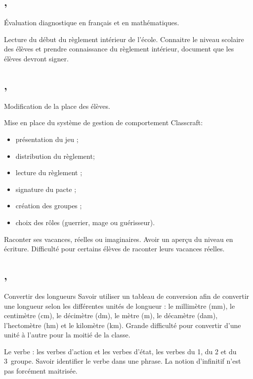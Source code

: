 \documentclass{article}
\begin{document}
	
	\subsection{ \sep}
	\textbullet{} Évaluation diagnostique en français et en mathématiques.
	
	 Lecture du début du règlement intérieur de l’école.
	\obj Connaitre le niveau scolaire des élèves et prendre connaissance du règlement intérieur, document que les élèves devront signer.
	
	
	\subsection{ \sep}
	\textbullet{} Modification de la place des élèves.
	
	\textbullet{} Mise en place du système de gestion de comportement Classcraft:
	\begin{itemize}
		\item présentation du jeu ;
		\item distribution du règlement;
		\item lecture du règlement ;
		\item signature du pacte ;
		\item création des groupes ;
		\item choix des rôles (guerrier, mage ou guérisseur).
	\end{itemize}\vspace{1ex}
	
	 Raconter ses vacances, réelles ou imaginaires.
	\obj Avoir un aperçu du niveau en écriture.
	\bil Difficulté pour certains élèves de raconter leurs vacances réelles.
	
	
	\subsection{ \sep}
	\dIs\cma{} Convertir des longueurs
	\obj Savoir utiliser un tableau de conversion afin de convertir une longueur selon les différentes unités de longueur : le millimètre (mm), le centimètre (cm), le décimètre (dm), le mètre (m), le décamètre (dam), l’hectomètre (hm) et le kilomètre (km).
	\bil Grande difficulté pour convertir d’une unité à l’autre pour la moitié de la classe.
	
	\Dis\cfr{} Le verbe : les verbes d’action et les verbes d’état, les verbes du 1\ier{}, du 2\ieme{} et du 3\ieme{}~groupe.
	\obj Savoir identifier le verbe dans une phrase.
	\bil La notion d’infinitif n’est pas forcément maitrisée.
	
\end{document}
